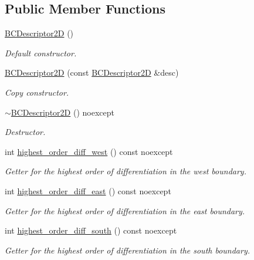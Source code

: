 \subsection*{Public Member Functions}
\begin{DoxyCompactItemize}
\item 
\hyperlink{classmtk_1_1BCDescriptor2D_abbc3af29202dbfef203f4cafd9566fd0}{B\+C\+Descriptor2\+D} ()
\begin{DoxyCompactList}\small\item\em Default constructor. \end{DoxyCompactList}\item 
\hyperlink{classmtk_1_1BCDescriptor2D_ae8a93352a94efed52747b710e6ff7893}{B\+C\+Descriptor2\+D} (const \hyperlink{classmtk_1_1BCDescriptor2D}{B\+C\+Descriptor2\+D} \&desc)
\begin{DoxyCompactList}\small\item\em Copy constructor. \end{DoxyCompactList}\item 
\hyperlink{classmtk_1_1BCDescriptor2D_ae14e62548a8bc080d576fff6937c546b}{$\sim$\+B\+C\+Descriptor2\+D} () noexcept
\begin{DoxyCompactList}\small\item\em Destructor. \end{DoxyCompactList}\item 
int \hyperlink{classmtk_1_1BCDescriptor2D_a0fa469ddf6ff76e2858d6d3b76cc8b6f}{highest\+\_\+order\+\_\+diff\+\_\+west} () const noexcept
\begin{DoxyCompactList}\small\item\em Getter for the highest order of differentiation in the west boundary. \end{DoxyCompactList}\item 
int \hyperlink{classmtk_1_1BCDescriptor2D_a5a9b80a2e9e579b05d9f3589d80448b6}{highest\+\_\+order\+\_\+diff\+\_\+east} () const noexcept
\begin{DoxyCompactList}\small\item\em Getter for the highest order of differentiation in the east boundary. \end{DoxyCompactList}\item 
int \hyperlink{classmtk_1_1BCDescriptor2D_a463d909f6014e7f01b33171a06d7b400}{highest\+\_\+order\+\_\+diff\+\_\+south} () const noexcept
\begin{DoxyCompactList}\small\item\em Getter for the highest order of differentiation in the south boundary. \end{DoxyCompactList}\item 

\end{DoxyCompactItemize}
